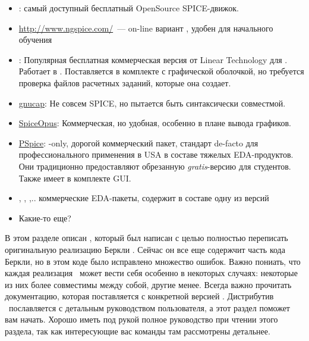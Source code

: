\begin{itemize}
\item \href{http://ngspice.sourceforge.net/}{\ngs}: самый доступный
бесплатный OpenSource SPICE-движок.
\item \url{http://www.ngspice.com/}\ --- on-line вариант , удобен
для начального обучения
\item \href{http://www.linear.com/designtools/software/}{\lts}:
Популярная бесплатная коммерческая версия от Linear Technology для \win.
Работает в . Поставляется в комплекте с графической оболочкой,
но требуется проверка файлов расчетных заданий, которые она создает.
\item
\href{https://www.gnu.org/software/gnucap/}{gnucap}:
Не совсем SPICE, но пытается быть синтаксически совместмой.
\item \href{http://www.spiceopus.si/}{SpiceOpus}: Коммерческая, но
удобная, особенно в плане вывода графиков.
\item
\href{http://www.cadence.com/products/orcad/pspice_simulation/Pages/default.aspx}{PSpice}:
\win-only, дорогой коммерческий пакет, стандарт de-facto для
профессионального применения в USA в составе тяжелых EDA-продуктов.
Они традиционно предоставляют обрезанную \emph{gratis}-версию для студентов.
Также имеет в комплекте GUI.
\item {}, , ,.. коммерческие
EDA-пакеты, содержит в составе одну из версий 
\item Какие-то еще?
\end{itemize}

В этом разделе описан \ngs, который был написан с целью полностью переписать
оригинальную реализацию Беркли \spice. Сейчас он все еще содержчит часть кода
Беркли, но в этом коде было исправлено множество ошибок.
Важно пониать, что каждая реализация \spice\ может вести себя особенно в
некоторых случаях: некоторые из них более совместимы между собой, другие менее.
Всегда важно прочитать документацию, которая поставляется с конкретной
версией \spice. Дистрибутив \ngs\ пославляется с детальным руководством
пользователя, а этот раздел поможет вам начать. Хорошо иметь под рукой полное
руководство при чтении этого раздела, так как интересующие вас команды там
рассмотрены детальнее.



